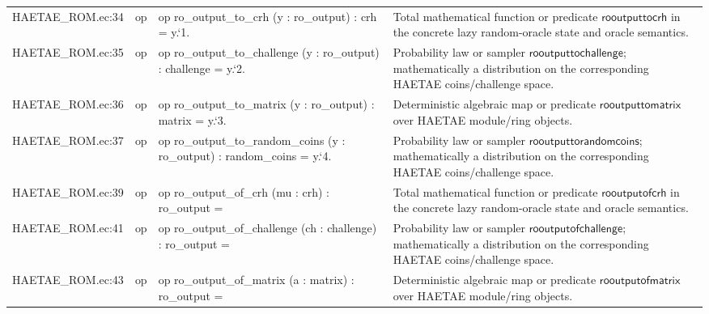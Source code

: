 \documentclass[10pt]{article}
\begin{document}
\begin{longtable}{L{0.11\textwidth}L{0.055\textwidth}L{0.385\textwidth}L{0.41\textwidth}}
HAETAE\_\allowbreak{}ROM.\allowbreak{}ec:\allowbreak{}34 & op & {\ttfamily\scriptsize op ro\_\allowbreak{}output\_\allowbreak{}to\_\allowbreak{}crh (y : ro\_\allowbreak{}output) : crh = y.`1.} & Total mathematical function or predicate $\mathsf{rooutputtocrh}$ in the concrete lazy random-oracle state and oracle semantics. \\
HAETAE\_\allowbreak{}ROM.\allowbreak{}ec:\allowbreak{}35 & op & {\ttfamily\scriptsize op ro\_\allowbreak{}output\_\allowbreak{}to\_\allowbreak{}challenge (y : ro\_\allowbreak{}output) : challenge = y.`2.} & Probability law or sampler $\mathsf{rooutputtochallenge}$; mathematically a distribution on the corresponding HAETAE coins/challenge space. \\
HAETAE\_\allowbreak{}ROM.\allowbreak{}ec:\allowbreak{}36 & op & {\ttfamily\scriptsize op ro\_\allowbreak{}output\_\allowbreak{}to\_\allowbreak{}matrix (y : ro\_\allowbreak{}output) : matrix = y.`3.} & Deterministic algebraic map or predicate $\mathsf{rooutputtomatrix}$ over HAETAE module/ring objects. \\
HAETAE\_\allowbreak{}ROM.\allowbreak{}ec:\allowbreak{}37 & op & {\ttfamily\scriptsize op ro\_\allowbreak{}output\_\allowbreak{}to\_\allowbreak{}random\_\allowbreak{}coins (y : ro\_\allowbreak{}output) : random\_\allowbreak{}coins = y.`4.} & Probability law or sampler $\mathsf{rooutputtorandomcoins}$; mathematically a distribution on the corresponding HAETAE coins/challenge space. \\
HAETAE\_\allowbreak{}ROM.\allowbreak{}ec:\allowbreak{}39 & op & {\ttfamily\scriptsize op ro\_\allowbreak{}output\_\allowbreak{}of\_\allowbreak{}crh (mu : crh) : ro\_\allowbreak{}output =} & Total mathematical function or predicate $\mathsf{rooutputofcrh}$ in the concrete lazy random-oracle state and oracle semantics. \\
HAETAE\_\allowbreak{}ROM.\allowbreak{}ec:\allowbreak{}41 & op & {\ttfamily\scriptsize op ro\_\allowbreak{}output\_\allowbreak{}of\_\allowbreak{}challenge (ch : challenge) : ro\_\allowbreak{}output =} & Probability law or sampler $\mathsf{rooutputofchallenge}$; mathematically a distribution on the corresponding HAETAE coins/challenge space. \\
HAETAE\_\allowbreak{}ROM.\allowbreak{}ec:\allowbreak{}43 & op & {\ttfamily\scriptsize op ro\_\allowbreak{}output\_\allowbreak{}of\_\allowbreak{}matrix (a : matrix) : ro\_\allowbreak{}output =} & Deterministic algebraic map or predicate $\mathsf{rooutputofmatrix}$ over HAETAE module/ring objects. \\

\end{longtable}
\end{document}
